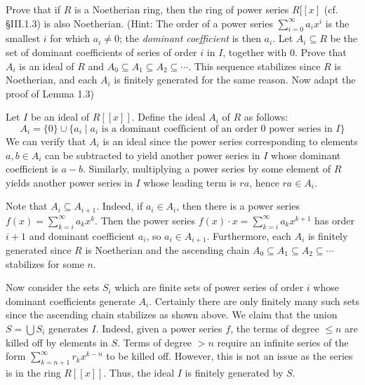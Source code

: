\documentclass[../../master.tex]{subfiles}
\begin{document}
    \begin{problem}
        Prove that if $R$ is a Noetherian ring, then the ring of power series 
        $R[[x]$ (cf. \S III.1.3) is also Noetherian. (Hint: The order of a power
        series $\sum_{i=0}^{\infty} a_{i} x^{i}$ is the smallest $i$ for which
        $a_{i} \neq 0$; the \textit{dominant coefficient} is then $a_{i}$. Let
        $A_{i} \subseteq R$ be the set of dominant coefficients of series of
        order $i$ in $I$, together with 0. Prove that $A_{i}$ is an ideal of
        $R$ and $A_0 \subseteq A_1 \subseteq A_2 \subseteq \cdots$. This
        sequence stabilizes since $R$ is Noetherian, and each $A_{i}$ is
        finitely generated for the same reason. Now adapt the proof of Lemma
        1.3)
    \end{problem}

    \begin{solution}
        Let $I$ be an ideal of $R[[x]]$. Define the ideal $A_{i}$ of $R$ as
        follows:
        \[
            A_{i} = \{0\} \cup \{a_{i} \mid a_{i} \text{ is a dominant
            coefficient of an order 0 power series in $I$} \}
        \] 
        We can verify that $A_{i}$ is an ideal since the power series
        corresponding to elements $a, b \in A_{i}$ can be subtracted to yield
        another power series in $I$ whose dominant coefficient is $a - b$.
        Similarly, multiplying a power series by some element of $R$ yields
        another power series in $I$ whose leading term is $ra$, hence $ra \in
        A_{i}$.

        Note that $A_{i} \subseteq A_{i+1}$. Indeed, if $a_{i} \in A_{i}$, then
        there is a power series $f(x) = \sum_{k = i}^{\infty} a_{k} x^{k}$. Then
        the power series $f(x) \cdot x = \sum_{k = i}^{\infty} a_{k} x^{k+1}$
        has order $i+1$ and dominant coefficient $a_{i}$, so $a_{i} \in A_{i+1}$.
        Furthermore, each $A_{i}$ is finitely generated since $R$ is Noetherian
        and the ascending chain $A_0 \subseteq A_1 \subseteq A_2 \subseteq
        \cdots$ stabilizes for some $n$.

        Now consider the sets $S_i$ which are finite sets of power series of
        order $i$ whose dominant coefficients generate $A_i$. Certainly there
        are only finitely many such sets since the ascending chain stabilizes as
        shown above. We claim that the union $S = \bigcup S_i$ generates $I$.
        Indeed, given a power series $f$, the terms of degree $\leq n$ are
        killed off by elements in $S$. Terms of degree $> n$ require an infinite
        series of the form $\sum_{k = n+1}^{\infty} r_k x^{k - n}$ to be killed
        off. However, this is not an issue as the series is in the ring
        $R[[x]]$. Thus, the ideal $I$ is finitely generated by $S$.
    \end{solution}
\end{document}
